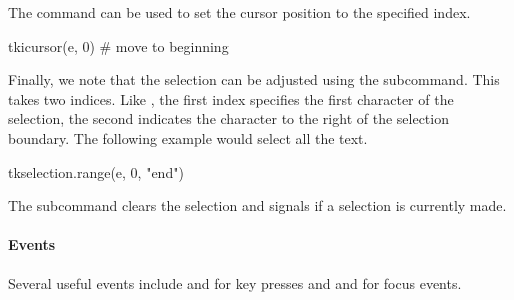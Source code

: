 The  command can be used to set the
cursor position to the specified index.
\begin{Schunk}
\begin{Sinput}
 tkicursor(e, 0)                         # move to beginning
\end{Sinput}
\end{Schunk}

Finally, we note that the selection can be adjusted using the
 subcommand. This takes two
indices. Like , the first index specifies the first character of
the selection, the second indicates the character to the right of the
selection boundary. The following example would select all the text.
\begin{Schunk}
\begin{Sinput}
 tkselection.range(e, 0, "end")
\end{Sinput}
\end{Schunk}
The  subcommand clears the selection and  signals if a selection is currently made.

\paragraph{Events}
Several useful events include  and
 for key presses and 
and  for focus events.




